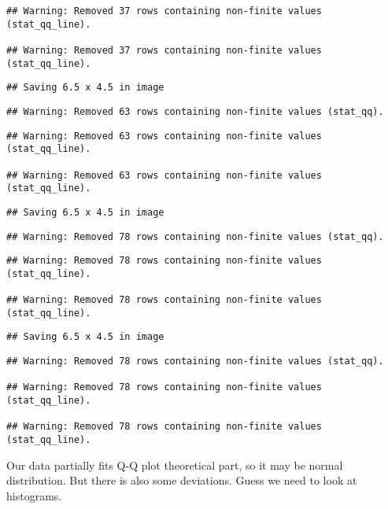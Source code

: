 \documentclass[
]{article}
\begin{document}
\begin{verbatim}
## Warning: Removed 37 rows containing non-finite values (stat_qq_line).

## Warning: Removed 37 rows containing non-finite values (stat_qq_line).
\end{verbatim}

\begin{verbatim}
## Saving 6.5 x 4.5 in image
\end{verbatim}

\begin{verbatim}
## Warning: Removed 63 rows containing non-finite values (stat_qq).
\end{verbatim}

\begin{verbatim}
## Warning: Removed 63 rows containing non-finite values (stat_qq_line).

## Warning: Removed 63 rows containing non-finite values (stat_qq_line).
\end{verbatim}

\begin{verbatim}
## Saving 6.5 x 4.5 in image
\end{verbatim}

\begin{verbatim}
## Warning: Removed 78 rows containing non-finite values (stat_qq).
\end{verbatim}

\begin{verbatim}
## Warning: Removed 78 rows containing non-finite values (stat_qq_line).

## Warning: Removed 78 rows containing non-finite values (stat_qq_line).
\end{verbatim}

\begin{verbatim}
## Saving 6.5 x 4.5 in image
\end{verbatim}

\begin{verbatim}
## Warning: Removed 78 rows containing non-finite values (stat_qq).

## Warning: Removed 78 rows containing non-finite values (stat_qq_line).

## Warning: Removed 78 rows containing non-finite values (stat_qq_line).
\end{verbatim}

Our data partially fits Q-Q plot theoretical part, so it may be normal
distribution. But there is also some deviations. Guess we need to look
at histograms.
\end{document}
